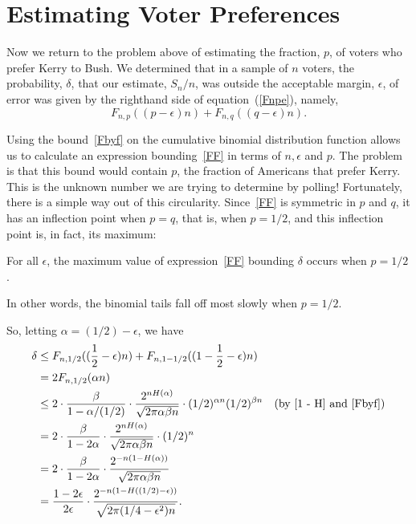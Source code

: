 \documentclass[11pt,twoside]{article}
\begin{document}
\section{Estimating Voter Preferences}

Now we return to the problem above of estimating the fraction, $p$, of
voters who prefer Kerry to Bush.  We determined that in a sample of $n$
voters, the probability, $\delta$, that our estimate, $S_n/n$, was outside
the acceptable margin, $\epsilon$, of error was given by the righthand side
of equation~(\ref{Fnpe}), namely,
\begin{equation}\label{FF}
F_{n,p}((p - \epsilon) n) + F_{n,q}((q-\epsilon) n).
\end{equation}

Using the bound~\eqref{Fbyf} on the cumulative binomial distribution
function allows us to calculate an expression bounding~\eqref{FF} in terms
of $n, \epsilon$ and $p$.  The problem is that this bound would contain
$p$, the fraction of Americans that prefer Kerry.  This is the unknown
number we are trying to determine by polling!  Fortunately, there is a
simple way out of this circularity.  Since~\eqref{FF} is symmetric in $p$
and $q$, it has an inflection point when $p=q$, that is, when $p=1/2$, and
this inflection point is, in fact, its maximum:
\begin{fact*}
For all $\epsilon$, the maximum value of expression~\eqref{FF} bounding
$\delta$ occurs when $p = 1/2$.
\end{fact*}
In other words, the binomial tails fall off most slowly when $p=1/2$.

So, letting $\alpha = (1/2) - \epsilon$, we have
\begin{align*}
\delta & \leq F_{n,1/2}((\frac{1}{2} - \epsilon) n) +
   F_{n,1 - 1/2}((1 -\frac{1}{2}-\epsilon) n)\notag\\
   & = 2 F_{n,1/2}(\alpha n)\notag\\
 & \le 2 \cdot \frac{\beta}{1 - \alpha / (1/2)} \cdot
		\frac{2^{n H(\alpha)}}{\sqrt{2 \pi \alpha \beta  n}} 
		\cdot (1/2)^{\alpha n} (1/2)^{\beta n}
   &\text{(by~\eqref{1 - H} and~\eqref{Fbyf})}\notag\\
 & =  2 \cdot \frac{\beta}{1 - 2\alpha} \cdot
		\frac{2^{n H(\alpha)}}{\sqrt{2 \pi \alpha \beta  n}}
		\cdot (1/2)^n\notag\\
 & = 2 \cdot \frac{\beta}{1 - 2\alpha} \cdot
		\frac{2^{-n (1 - H(\alpha))}}{\sqrt{2 \pi \alpha \beta n}}\\
 & = \frac{1 - 2\epsilon}{2\epsilon} \cdot
		\frac{2^{-n (1 - H((1/2) - \epsilon))}}{\sqrt{2 \pi (1/4 - \epsilon^2) n}}.
\end{align*}
\end{document}
